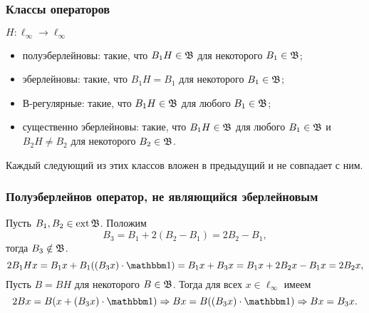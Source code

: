 \begin{frame}\frametitle{Классы операторов}
	$H:\ell_\infty \to \ell_\infty$
	\begin{itemize}
		\item
			полуэберлейновы: такие, что $B_1 H \in\mathfrak{B}$ для некоторого $B_1\in \mathfrak{B}$;
		\item
			эберлейновы: такие, что $B_1 H = B_1$ для некоторого $B_1\in \mathfrak{B}$;
		\item
			В-регулярные: такие, что $B_1 H \in \mathfrak{B}$ для любого   $B_1\in \mathfrak{B}$;
		\item
			существенно эберлейновы: такие, что $B_1 H \in \mathfrak{B}$ для любого $B_1\in \mathfrak{B}$ и $B_2 H \ne B_2$ для некоторого $B_2\in \mathfrak{B}$.
	\end{itemize}
	Каждый следующий из этих классов вложен в предыдущий и не совпадает с ним.
\end{frame}


\begin{frame}\frametitle{Полуэберлейнов оператор, не являющийся эберлейновым}
	Пусть $B_1, B_2 \in \operatorname{ext} \mathfrak{B}$.
	Положим
	\begin{equation}
		\label{eq:am_not_eber_def}
		B_3 = B_1 + 2(B_2-B_1) = 2B_2-B_1,
	\end{equation}
	тогда $B_3 \notin \mathfrak{B}$.
	\begin{equation}
		2 B_1 H x = B_1 x + B_1 ((B_3 x) \cdot\one) = B_1 x + B_3 x =
		B_1 x + 2 B_2 x - B_1 x = 2B_2 x
		,
	\end{equation}
	Пусть $B = BH$ для некоторого $B\in\mathfrak{B}$.
	Тогда для всех $x\in\ell_\infty$ имеем
	\begin{equation}
		2Bx = B (x + (B_3 x) \cdot \one)
		\Rightarrow
		Bx =  B((B_3 x) \cdot \one)
		\Rightarrow
		Bx = B_3x
		.
	\end{equation}
\end{frame}

